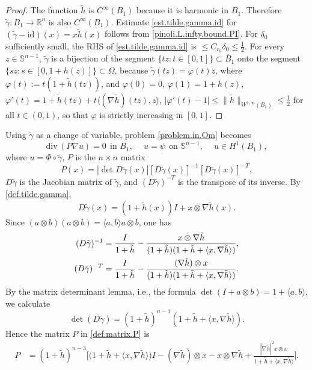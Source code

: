 \documentclass[10pt,reqno,a4paper]{article}
\numberwithin{equation}{section}
\theoremstyle{plain}
\theoremstyle{definition}
\newcommand{\R}{{\mathbb R}}
\renewcommand{\S}{{\mathbb S}}
\newcommand{\ph}{\varphi}
\newcommand{\Om}{\Omega}
\newcommand{\la}{\langle}
\newcommand{\ra}{\rangle}
\renewcommand{\div}{\mathrm{div}\,}
\newcommand{\grad}{\nabla}
\begin{document}
\begin{proof}
The function $\tilde h$ is $C^\infty(B_1)$ because it is harmonic in $B_1$. 
Therefore $\tilde \gamma : B_1 \to \R^n$ is also $C^\infty(B_1)$. 
Estimate \eqref{est.tilde.gamma.id} for $(\tilde \gamma - \mathrm{id})(x) = x \tilde h(x)$ 
follows from \eqref{pinoli.L.infty.bound.PI}. 
For $\delta_0$ sufficiently small, the RHS of \eqref{est.tilde.gamma.id} 
is $\leq C_{r_0} \delta_0 \leq \frac12$. 
For every $z \in \S^{n-1}$, 
$\tilde\gamma$ is a bijection of the segment $\{ tz : t \in [0,1] \} \subset \overline{B}_1$ 
onto the segment $\{ sz : s \in [0,1+h(z)] \} \subset \overline{\Om}$, 
because $\tilde \gamma(tz) = \ph(t) z$, where $\ph(t) :=  t (1 + \tilde h(tz))$, 
and $\ph(0) = 0$, $\ph(1) = 1+h(z)$, $\ph'(t) = 1 + \tilde h(tz) + t \la (\grad \tilde h)(tz) , z \ra$, 
$|\ph'(t) - 1| \leq \| \tilde h \|_{W^{1,\infty}(B_1)} \leq \frac12$ for all $t \in (0,1)$, 
so that $\ph$ is strictly increasing in $[0,1]$. 
\end{proof}


Using $\tilde \gamma$ as a change of variable, problem \eqref{problem.in.Om} becomes 
\begin{equation} \label{problem.in.B}
\div (P \grad u) = 0 \ \ \text{in } B_1, \quad \ 
u = \psi \ \ \text{on } \S^{n-1}, \quad \ 
u \in H^1(B_1),
\end{equation}
where $u = \Phi \circ \tilde \gamma$, 
$P$ is the $n \times n$ matrix
\begin{equation} \label{def.matrix.P}
P(x) = | \det D \tilde \gamma(x) | [ D \tilde \gamma (x) ]^{-1} [ D \tilde \gamma (x) ]^{-T},
\end{equation}
$D \tilde\gamma$ is the Jacobian matrix of $\tilde \gamma$, 
and $(D \tilde \gamma)^{-T}$ is the transpose of its inverse. 
By \eqref{def.tilde.gamma}, 
\[
D \tilde \gamma(x) = (1 + \tilde h(x)) I + x \otimes \grad \tilde h(x).
\]
Since $(a \otimes b)(a \otimes b) = \la a,b \ra a \otimes b$, one has 
\begin{align}
(D \tilde \gamma)^{-1} 
& = \frac{I}{1+\tilde h} 
- \frac{ x \otimes \grad \tilde h }{ (1 + \tilde h)(1 + \tilde h + \la x, \grad \tilde h \ra) }, 
\notag \\
(D \tilde \gamma)^{-T} 
& = \frac{I}{1+\tilde h} 
- \frac{ (\grad \tilde h) \otimes x }{ (1 + \tilde h)(1 + \tilde h + \la x, \grad \tilde h \ra) }.
\label{D.tilde.gamma.-T}
\end{align}
By the matrix determinant lemma, i.e., the formula $\det(I + a \otimes b) = 1 + \la a, b \ra$, 
we calculate 
\[
\det(D \tilde \gamma) = (1 + \tilde h)^{n-1} (1 + \tilde h + \la x, \grad \tilde h \ra).  
\]
Hence the matrix $P$ in \eqref{def.matrix.P} is 
\begin{align} \label{formula.P}
P & = (1+\tilde h)^{n-3} \bigg[ \big( 1 + \tilde h + \la x , \grad \tilde h \ra \big) I 
- (\grad \tilde h) \otimes x 
- x \otimes \grad \tilde h 
+ \frac{|\grad \tilde h|^2 x \otimes x}{ 1 + \tilde h + \la x , \grad \tilde h \ra } \bigg].
\end{align}
\end{document}
